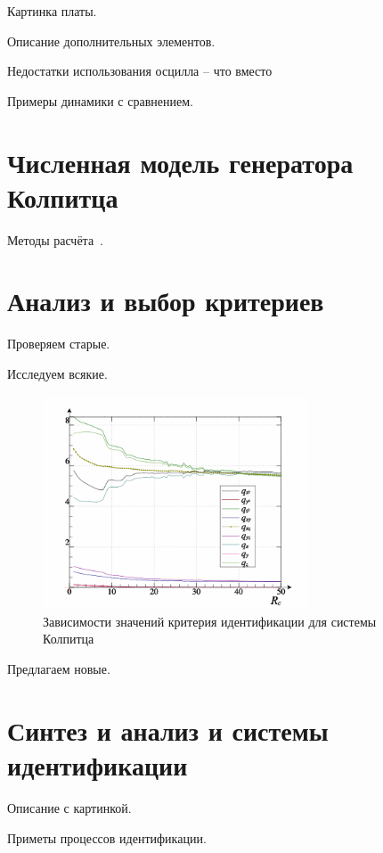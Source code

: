 Картинка платы.

Описание дополнительных элементов.

Недостатки использования осцилла -- что вместо

Примеры динамики с сравнением.

\section{Численная модель генератора Колпитца}

Методы расчёта~\cite{zaeplnii_radio_calc}.

\section{Анализ и выбор критериев}

Проверяем старые.

Исследуем всякие.

\begin{figure}[htb!]
\centerline{\includegraphics[width=0.7\textwidth]{p/colp_bjt_q-p_Rc_q.png} }
\caption{Зависимости значений критерия идентификации для системы Колпитца}
\label{atu:colp_bjt_q-p_Rc_q}
\end{figure}

Предлагаем новые.

\section{Синтез и анализ и системы идентификации}

Описание с картинкой.

Приметы процессов идентификации.

